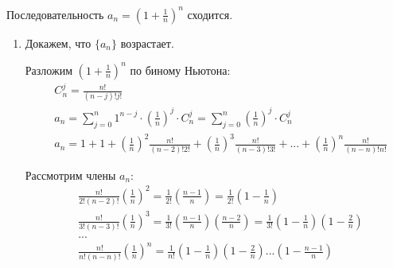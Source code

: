 \documentclass{article}
\begin{document}

\theorem

Последовательность $a_n=\left(1+\frac{1}{n}\right)^n$ сходится.

\proof

\begin{enumerate}
	\item{}Докажем, что $\{a_n\}$ возрастает.

	Разложим $\left(1+\frac{1}{n}\right)^{n}$ по биному Ньютона:
	\begin{align*}
		 & C^j_n=\frac{n!}{(n-j)!j!}                                                                               \\
		 & a_n=\sum\limits_{j=0}^n 1^{n-j}\cdot\left(\frac{1}{n}\right)^j\cdot C^j_n
		=\sum_{j=0}^{n}\left(\frac{1}{n}\right)^{j}\cdot C_{n}^{j}                                                 \\
		 & a_n=1+1+\left(\frac{1}{n}\right)^2\frac{n!}{(n-2)!2!}+\left(\frac{1}{n}\right)^3\frac{n!}{(n-3)!3!}+...
		+\left(\frac{1}{n}\right)^n\frac{n!}{(n-n)!n!}
	\end{align*}

	Рассмотрим члены $a_{n}$:
	\begin{align*}
		 & \frac{n!}{2!(n-2)!}\left(\frac{1}{n}\right)^2=\frac{1}{2!}\left(\frac{n-1}{n}\right)=\frac{1}{2!}\left(1-\frac{1}{n}\right)                            \\
		 & \frac{n!}{3!(n-3)!}\left(\frac{1}{n}\right)^3=\frac{1}{3!}\left(\frac{n-1}{n}\right)\left(\frac{n-2}{n}\right)
		=\frac{1}{3!}\left(1-\frac{1}{n}\right)\left(1-\frac{2}{n}\right)                                                                                         \\
		 & ...                                                                                                                                                    \\
		 & \frac{n!}{n!(n-n)!}\left(\frac{1}{n}\right)^n=\frac{1}{n!}\left(1-\frac{1}{n}\right)\left(1-\frac{2}{n}\right) \text{...} \left(1-\frac{n-1}{n}\right)
	\end{align*}


\end{enumerate}
\end{document}
